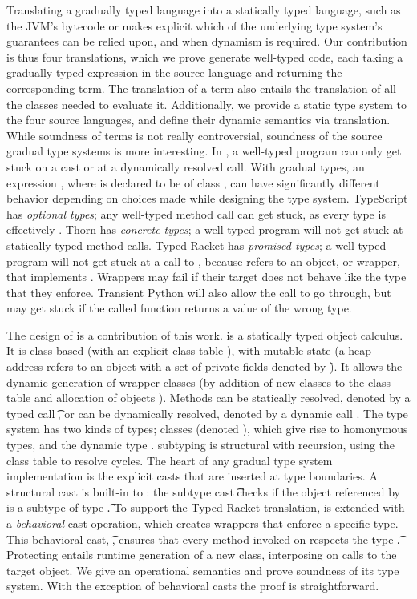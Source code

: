 \documentclass[acmsmall, anonymous, authordraft, review]{acmart} %
\begin{document}
Translating a gradually typed language into a statically typed language,
such as the JVM's bytecode or \kafka makes explicit which of the underlying
type system's guarantees can be relied upon, and when dynamism is required.
Our contribution is thus four translations, which we prove generate
well-typed code, each taking a gradually typed expression \HT\e\T in the
source language and returning the corresponding \kafka term. The translation
of a term also entails the translation of all the classes needed to evaluate
it. Additionally, we provide a static type system to the four source
languages, and define their dynamic semantics via translation.  While
soundness of \kafka terms is not really controversial, soundness of the
source gradual type systems is more interesting.  In \kafka, a well-typed
program can only get stuck on a cast or at a dynamically resolved call.
With gradual types, an expression \Call\x\m\e, where \x is declared to be of
class \C, can have significantly different behavior depending on choices
made while designing the type system. TypeScript has \emph{optional types};
any well-typed method call can get stuck, as every type is effectively
\any. Thorn has \emph{concrete types}; a well-typed program will not get
stuck at statically typed method calls. Typed Racket has \emph{promised
  types}; a well-typed program will not get stuck at a call to \m, because
\x refers to an object, or wrapper, that implements \m. Wrappers may fail if
their target does not behave like the type that they enforce. Transient
Python will also allow the call to go through, but may get stuck if the
called function returns a value of the wrong type.

The design of \kafka is a contribution of this work.  \kafka is a statically
typed object calculus.  It is class based (with an explicit class table \K),
with mutable state (a heap address \a refers to an object with a set of
private fields denoted by \f). It allows the dynamic generation of wrapper
classes (by addition of new classes to the class table \K and allocation of
objects \a).  Methods can be statically resolved, denoted by a typed call
\KCall\a\m\x\t\tp, or can be dynamically resolved, denoted by a dynamic call
\DynCall\a\m\x. The \kafka type system has two kinds of types; classes
(denoted \C), which give rise to homonymous types, and the dynamic type
\any.  \kafka subtyping is structural with recursion, using the class table
\K to resolve cycles.  The heart of any gradual type system implementation
is the explicit casts that are inserted at type boundaries.  A structural
cast is built-in to \kafka: the subtype cast \SubCast\t\a checks if the
object referenced by \a is a subtype of type \t.  To support the Typed
Racket translation, \kafka is extended with a \emph{behavioral} cast
operation, which creates wrappers that enforce a specific type. This
behavioral cast, \BehCast\t\a, ensures that every method \m invoked on \a
respects the type \t.  Protecting \a entails runtime generation of a new
class, interposing on calls to the target object. We give \kafka an
operational semantics and prove soundness of its type system. With the
exception of behavioral casts the proof is straightforward.
\end{document}
